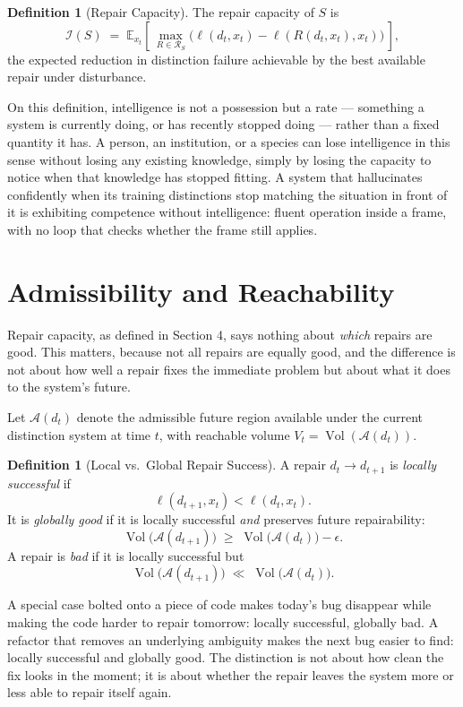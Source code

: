 \documentclass[11pt]{article}
\theoremstyle{plain}
\theoremstyle{definition}
\newtheorem{definition}[theorem]{Definition}
\theoremstyle{remark}
\begin{document}
\begin{definition}[Repair Capacity]
The repair capacity of $S$ is
\[
\mathcal{I}(S) \;=\; \mathbb{E}_{x_t}\left[\, \max_{R \in \mathcal{R}_S} \big(\ell(d_t,x_t) - \ell(R(d_t,x_t),x_t)\big) \,\right],
\]
the expected reduction in distinction failure achievable by the best available repair under disturbance.
\end{definition}

On this definition, intelligence is not a possession but a rate --- something a system is currently doing, or has recently stopped doing --- rather than a fixed quantity it has. A person, an institution, or a species can lose intelligence in this sense without losing any existing knowledge, simply by losing the capacity to notice when that knowledge has stopped fitting. A system that hallucinates confidently when its training distinctions stop matching the situation in front of it is exhibiting competence without intelligence: fluent operation inside a frame, with no loop that checks whether the frame still applies.

\section{Admissibility and Reachability}

Repair capacity, as defined in Section 4, says nothing about \emph{which} repairs are good. This matters, because not all repairs are equally good, and the difference is not about how well a repair fixes the immediate problem but about what it does to the system's future.

Let $\mathcal{A}(d_t)$ denote the admissible future region available under the current distinction system at time $t$, with reachable volume $V_t = \operatorname{Vol}(\mathcal{A}(d_t))$.

\begin{definition}[Local vs.\ Global Repair Success]
A repair $d_t \to d_{t+1}$ is \emph{locally successful} if
\[
\ell(d_{t+1}, x_t) < \ell(d_t, x_t).
\]
It is \emph{globally good} if it is locally successful \emph{and} preserves future repairability:
\[
\operatorname{Vol}\big(\mathcal{A}(d_{t+1})\big) \;\ge\; \operatorname{Vol}\big(\mathcal{A}(d_t)\big) - \epsilon.
\]
A repair is \emph{bad} if it is locally successful but
\[
\operatorname{Vol}\big(\mathcal{A}(d_{t+1})\big) \;\ll\; \operatorname{Vol}\big(\mathcal{A}(d_t)\big).
\]
\end{definition}

A special case bolted onto a piece of code makes today's bug disappear while making the code harder to repair tomorrow: locally successful, globally bad. A refactor that removes an underlying ambiguity makes the next bug easier to find: locally successful and globally good. The distinction is not about how clean the fix looks in the moment; it is about whether the repair leaves the system more or less able to repair itself again.
\end{document}
